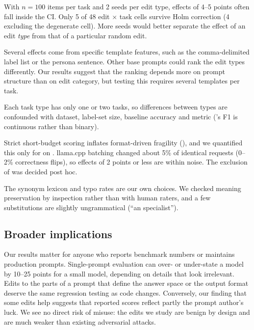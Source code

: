  With $n = 100$ items per task and 2 seeds per edit type, effects of 4--5 points often fall inside the CI. Only 5 of 48 edit $\times$ task cells survive Holm correction (4 excluding the degenerate \llama \agnews cell). More seeds would better separate the effect of an edit \emph{type} from that of a particular random edit.

 Several effects come from specific template features, such as the comma-delimited label list or the persona sentence. Other base prompts could rank the edit types differently. Our results suggest that the ranking depends more on prompt structure than on edit category, but testing this requires several templates per task.

 Each task type has only one or two tasks, so differences between types are confounded with dataset, label-set size, baseline accuracy and metric (\squad's F1 is continuous rather than binary).

 Strict short-budget scoring inflates format-driven fragility (), and we quantified this only for \llama on \arc. llama.cpp batching changed about 5\% of identical requests (0--2\% correctness flips), so effects of 2 points or less are within noise. The exclusion of \llama \agnews was decided post hoc.

 The synonym lexicon and typo rates are our own choices. We checked meaning preservation by inspection rather than with human raters, and a few substitutions are slightly ungrammatical (\eg ``an specialist'').

\subsection{Broader implications}
Our results matter for anyone who reports benchmark numbers or maintains production prompts. Single-prompt evaluation can over- or under-state a model by 10--25 points for a small model, depending on details that look irrelevant. Edits to the parts of a prompt that define the answer space or the output format deserve the same regression testing as code changes. Conversely, our finding that some edits help suggests that reported scores reflect partly the prompt author's luck. We see no direct risk of misuse: the edits we study are benign by design and are much weaker than existing adversarial attacks.
